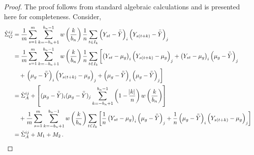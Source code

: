 \documentclass[12pt]{article}
\theoremstyle{remark}
\begin{document}
\begin{proof}
The proof follows from standard algebraic calculations and is presented here for completeness. Consider,
\begin{align*}
\hat{\Sigma}_{G}^{ij} &= \dfrac{1}{m}\sum_{s=1}^{m} \sum_{k=-b_n+1}^{b_n-1}w\left(\dfrac{k}{b_n}\right)\dfrac{1}{n}\sum_{t \in I_k} \left(Y_{st}-\bar{\bar{Y}} \right)_i \left(Y_{s(t+k)}-\bar{\bar{Y}} \right)_j\\
&= \dfrac{1}{m}\sum_{s=1}^{m}\sum_{k=-b_n+1}^{b_n-1}w\left(\dfrac{k}{b_n}\right)\dfrac{1}{n}\sum_{t \in I_k}  \left[ \left(Y_{st}-\mu_g \right)_i  \left(Y_{s(t+k)}-\mu_g \right)_j+  \left(Y_{st} - \mu_g \right)_i    \left(\mu_g - \bar{\bar{Y}} \right)_j \right. \\  
& \quad + \left. \left(\mu_g-\bar{\bar{Y}} \right)_i  \left(Y_{s(t+k)}-\mu_g \right)_j + \left(\mu_g-\bar{\bar{Y}} \right)_i  \left(\mu_g-\bar{\bar{Y}}  \right)_j  \right]\\
& = \tilde{\Sigma}^{ij}_A + \left[(\mu_g-\bar{\bar{Y}})_i(\mu_g-\bar{\bar{Y}})_j\sum_{k=-b_n+1}^{b_n-1}\left(1-\dfrac{\abs{k}}{n}\right)w\left(\dfrac{k}{b_n}\right)\right] \\ 
& \quad  + \dfrac{1}{m}\sum_{s=1}^{m}\sum_{k=-b_n+1}^{b_n-1}  w\left(\dfrac{k}{b_n}\right)\sum_{t \in I_k}  \left[\dfrac{1}{n} \left(Y_{st} - \mu_g \right)_i \left(\mu_g - \bar{\bar{Y}} \right)_j + \dfrac{1}{n} \left(\mu_g-\bar{\bar{Y}} \right)_i  \left(Y_{s(t+k)}-\mu_g \right)_j \right] \\ 
& = \tilde{\Sigma}^{ij}_A + M_1 + M_2\,.
\end{align*}


\end{proof}
\end{document}
